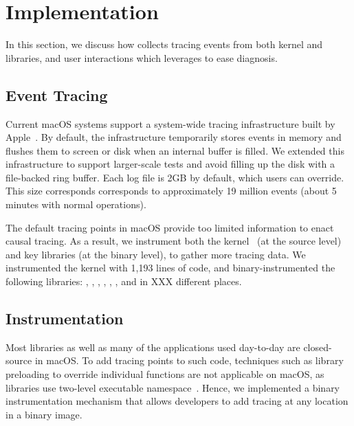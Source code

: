 \section{Implementation}\label{sec:implementation}

In this section, we discuss how \xxx collects tracing events from both kernel
and libraries, and user interactions which \xxx leverages to ease diagnosis.

\subsection{Event Tracing}
Current macOS systems support a system-wide tracing infrastructure built by
Apple~\cite{linktotracetool}. By default, the infrastructure temporarily stores
events in memory and flushes them to screen or disk when an internal buffer is
filled. We extended this infrastructure to support larger-scale tests and avoid
filling up the disk with a file-backed ring buffer. Each log file is 2GB by
default, which users can override. This size corresponds corresponds to
approximately 19 million events (about 5 minutes with normal operations).

The default tracing points in macOS provide too limited information to enact
causal tracing. As a result, we instrument both the
kernel~\cite{linkofxnusourcecode} (at the source level) and key libraries (at
the binary level), to gather more tracing data. We instrumented the kernel with
1,193 lines of code, and binary-instrumented the following libraries:
, , ,
, , ,  and
 in XXX different places. 



\subsection{Instrumentation}

Most libraries as well as many of the applications used day-to-day are
closed-source in macOS. To add tracing points to such code, techniques such as
library preloading to override individual functions are not applicable on macOS,
as libraries use two-level executable namespace~\cite{twolayernamespace}. Hence,
we implemented a binary instrumentation mechanism that allows developers to add
tracing at any location in a binary image.

